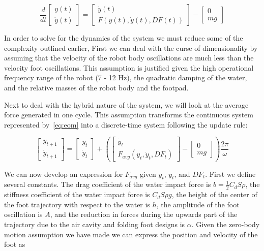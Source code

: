 \begin{equation}
	\frac{d}{dt} \begin{bmatrix} y(t) \\ \dot{y}(t) \end{bmatrix} = \begin{bmatrix} \dot{y}(t) \\ F(y(t),\dot{y}(t), DF(t)) \end{bmatrix} - \begin{bmatrix} 0 \\ mg \end{bmatrix}
	\label{eq:eom}
\end{equation}

In order to solve for the dynamics of the system we must reduce some of the complexity outlined earlier, First we can deal with the curse of dimensionality by assuming that the velocity of the robot body oscillations are much less than the velocity foot oscillations. This assumption is justified given the high operational frequency range of the robot (7 - 12 Hz), the quadratic damping of the water, and the relative masses of the robot body and the footpad.
	
Next to deal with the hybrid nature of the system, we will look at the average force generated in one cycle. This assumption transforms the continuous system represented by~\ref{eq:eom} into a discrete-time system following the update rule:

\begin{equation}
	\begin{bmatrix} y_{t+1} \\ \dot{y}_{t+1} \end{bmatrix} = \begin{bmatrix} y_{t} \\ \dot{y}_{t} \end{bmatrix} + \left( \begin{bmatrix}  \dot{y}_t \\ F_{avg}(y_t,\dot{y}_t, DF_t) \end{bmatrix} - \begin{bmatrix} 0 \\ mg  \end{bmatrix} \right) \frac{2 \pi}{\omega}
	\label{eq:eom_discrete}
\end{equation}

We can now develop an expression for $F_{avg}$ given $y_t$, $\dot{y}_t$, and $DF_t$. First we define several constants. The drag coefficient of the water impact force is $b = \frac{1}{2} C_d S \rho$, the stiffness coefficient of the water impact force is $C_d S \rho g$, the height of the center of the foot trajectory with respect to the water is $h$, the amplitude of the foot oscillation is $A$, and the reduction in forces during the upwards part of the trajectory due to the air cavity and folding foot designs is $\alpha$. Given the zero-body motion assumption we have made we can express the position and velocity of the foot as


